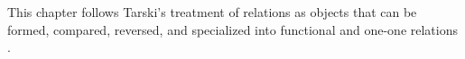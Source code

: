 \begin{remark*}
This chapter follows Tarski's treatment of relations as objects that can be
formed, compared, reversed, and specialized into functional and one-one
relations \cite{Tarski1941IntroductionLogic}.
\end{remark*}



